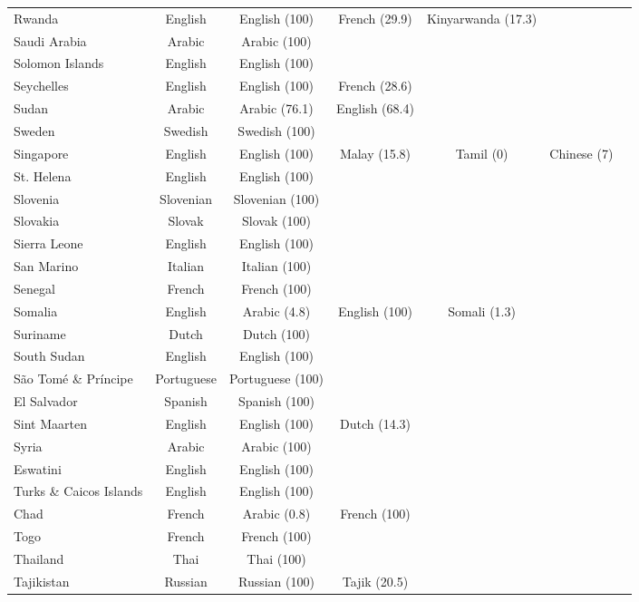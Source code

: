\begin{longtable}{lc | c | c | c | c | c}
 Rwanda & English & English (100) & French (29.9) & Kinyarwanda (17.3) &   &   \\ 
 Saudi Arabia & Arabic & Arabic (100) &   &   &   &   \\ 
 Solomon Islands & English & English (100) &   &   &   &   \\ 
 Seychelles & English & English (100) & French (28.6) &   &   &   \\ 
 Sudan & Arabic & Arabic (76.1) & English (68.4) &   &   &   \\ 
 Sweden & Swedish & Swedish (100) &   &   &   &   \\ 
 Singapore & English & English (100) & Malay (15.8) & Tamil (0) & Chinese (7) &   \\ 
 St. Helena & English & English (100) &   &   &   &   \\ 
 Slovenia & Slovenian & Slovenian (100) &   &   &   &   \\ 
 Slovakia & Slovak & Slovak (100) &   &   &   &   \\ 
 Sierra Leone & English & English (100) &   &   &   &   \\ 
 San Marino & Italian & Italian (100) &   &   &   &   \\ 
 Senegal & French & French (100) &   &   &   &   \\ 
 Somalia & English & Arabic (4.8) & English (100) & Somali (1.3) &   &   \\ 
 Suriname & Dutch & Dutch (100) &   &   &   &   \\ 
 South Sudan & English & English (100) &   &   &   &   \\ 
 São Tomé \& Príncipe & Portuguese & Portuguese (100) &   &   &   &   \\ 
 El Salvador & Spanish & Spanish (100) &   &   &   &   \\ 
 Sint Maarten & English & English (100) & Dutch (14.3) &   &   &   \\ 
 Syria & Arabic & Arabic (100) &   &   &   &   \\ 
 Eswatini & English & English (100) &   &   &   &   \\ 
 Turks \& Caicos Islands & English & English (100) &   &   &   &   \\ 
 Chad & French & Arabic (0.8) & French (100) &   &   &   \\ 
 Togo & French & French (100) &   &   &   &   \\ 
 Thailand & Thai & Thai (100) &   &   &   &   \\ 
 Tajikistan & Russian & Russian (100) & Tajik (20.5) &   &   &   \\ 

\end{longtable}
